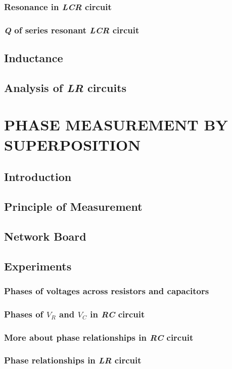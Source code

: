 \documentclass[12pt]{book}
\begin{document}
\subsection{Resonance in \textit{LCR} circuit}
\subsection{\textit{Q} of series resonant \textit{LCR} circuit}
\section{Inductance}
\section{Analysis of \textit{LR} circuits}

\chapter{PHASE MEASUREMENT BY SUPERPOSITION}
\section{Introduction}
\section{Principle of Measurement}
\section{Network Board}
\section{Experiments}
\subsection{Phases of voltages across resistors and capacitors}
\subsection{Phases of $V_R$ and $V_C$ in \textit{RC} circuit}
\subsection{More about phase relationships in \textit{RC} circuit}
\subsection{Phase relationships in \textit{LR} circuit}
\end{document}
